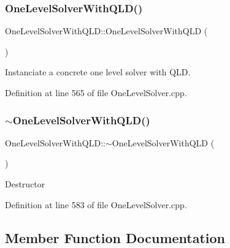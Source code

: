 \subsubsection{\texorpdfstring{One\+Level\+Solver\+With\+Q\+L\+D()}{OneLevelSolverWithQLD()}}
{\footnotesize\ttfamily One\+Level\+Solver\+With\+Q\+L\+D\+::\+One\+Level\+Solver\+With\+Q\+LD (\begin{DoxyParamCaption}{ }\end{DoxyParamCaption})}

Instanciate a concrete one level solver with Q\+LD. 

Definition at line 565 of file One\+Level\+Solver.\+cpp.

\hypertarget{classocra_1_1OneLevelSolverWithQLD_aaedebe9fe695e3bca4a9010b88386fcc}{}\label{classocra_1_1OneLevelSolverWithQLD_aaedebe9fe695e3bca4a9010b88386fcc} 
\subsubsection{\texorpdfstring{$\sim$\+One\+Level\+Solver\+With\+Q\+L\+D()}{~OneLevelSolverWithQLD()}}
{\footnotesize\ttfamily One\+Level\+Solver\+With\+Q\+L\+D\+::$\sim$\+One\+Level\+Solver\+With\+Q\+LD (\begin{DoxyParamCaption}{ }\end{DoxyParamCaption})\hspace{0.3cm}{\ttfamily [virtual]}}

Destructor 

Definition at line 583 of file One\+Level\+Solver.\+cpp.



\subsection{Member Function Documentation}
\hypertarget{classocra_1_1OneLevelSolverWithQLD_a8dc1522a50198d0120de3b29e94d66e8}{}\label{classocra_1_1OneLevelSolverWithQLD_a8dc1522a50198d0120de3b29e94d66e8} 
